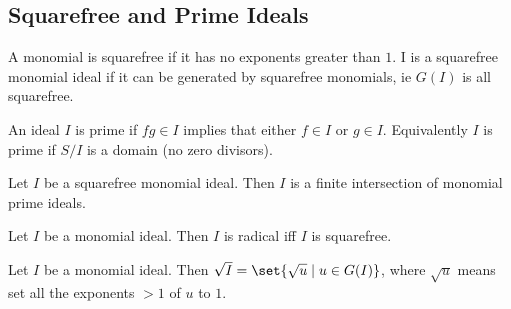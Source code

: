 \subsection{Squarefree and Prime Ideals}

\begin{definition}
A monomial is squarefree if it has no exponents greater than $1$. I is a squarefree monomial ideal if it can be generated by squarefree monomials, ie $G(I)$ is all squarefree.
\end{definition}

\begin{definition}
An ideal $I$ is prime if $fg \in I$ implies that either $f\in I$ or $g \in I$. Equivalently $I$ is prime if $S / I$ is a domain (no zero divisors).
\end{definition}

\begin{proposition}
Let $I$ be a squarefree monomial ideal. Then $I $ is a finite intersection of monomial prime ideals.
\end{proposition}


\begin{corollary}
Let $I$ be a monomial ideal. Then $I$ is radical iff $I$ is squarefree.
\end{corollary}

\begin{theorem}
Let $I$ be a monomial ideal. Then $\sqrt{I} = \set{\sqrt{u } \mid u \in G(I)}$, where $\sqrt{u}$ means set all the exponents $>1$ of $u$ to $1$.
\end{theorem}
